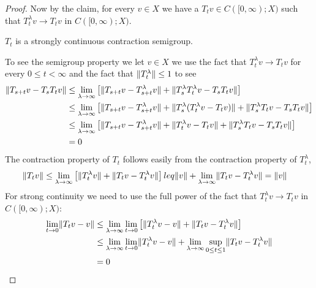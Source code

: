 \begin{proof}
Now by the claim, for every $v \in X$ we have a $T_t v \in C([0,\infty); X)$ such that $T^\lambda_t v \to T_t v$ in $C([0,\infty); X)$.  
\begin{clm} $T_t$ is a strongly continuous contraction semigroup.
\end{clm}
To see the semigroup property we let $v \in X$ we use the fact that $T^\lambda_t v \to T_t v$ for every $0 \leq t < \infty$ and the fact that $\lVert T^\lambda_t \rVert \leq 1$ to see
\begin{align*}
\lVert T_{s+t} v - T_s T_t v \rVert &\leq \lim_{\lambda \to \infty} \left [\lVert T_{s+t} v - T^\lambda_{s+t} v \rVert + \lVert T^\lambda_s T^\lambda_t v - T_s T_t v \rVert  \right] \\
&\leq \lim_{\lambda \to \infty} \left[ \lVert T_{s+t} v - T^\lambda_{s+t} v  \rVert + \lVert T^\lambda_s (T^\lambda_t v - T_t v) \rVert + \lVert T^\lambda_s T_t v - T_s T_t v \rVert \right] \\
&\leq \lim_{\lambda \to \infty} \left[ \lVert T_{s+t} v - T^\lambda_{s+t} v  \rVert + \lVert T^\lambda_t v - T_t v \rVert + \lVert T^\lambda_s T_t v - T_s T_t v \rVert \right] \\
&=0
\end{align*}
The contraction property of $T_t$ follows easily from the contraction property of $T^\lambda_t$,
\begin{align*}
\lVert T_t v \rVert &\leq \lim_{\lambda \to \infty} \left[\lVert T^\lambda_t v \rVert + \lVert T_tv - T^\lambda_t v \rVert \right] leq \lVert v \rVert + \lim_{\lambda \to \infty} \lVert T_tv - T^\lambda_t v \rVert = \lVert v \rVert
\end{align*}
For strong continuity we need to use the full power of the fact that $T^\lambda_t v \to T_t v$ in $C([0,\infty); X)$:
\begin{align*}
\lim_{t \to 0} \lVert T_t v - v \rVert &\leq \lim_{\lambda \to \infty} \lim_{t \to 0} \left[ \lVert T^\lambda_t v - v \rVert + \lVert T_t v - T^\lambda_t v \rVert \right] \\
&\leq \lim_{\lambda \to \infty} \lim_{t \to 0} \lVert T^\lambda_t v - v \rVert + \lim_{\lambda \to \infty} \sup_{0 \leq t \leq 1} \lVert T_t v - T^\lambda_t v \rVert \\
&= 0
\end{align*}


\end{proof}

